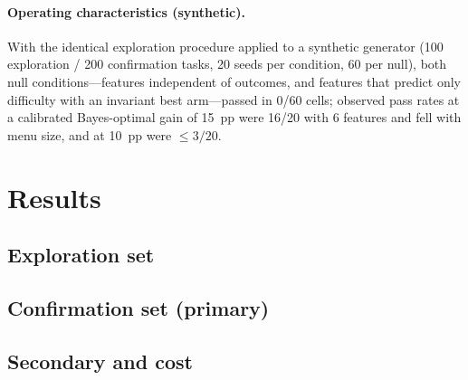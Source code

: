 \documentclass{article}
\newif\ifdraftmode
\newcommand{\draftnote}[1]{\ifdraftmode{\color{red}\textbf{[DRAFT: #1]}}\else\PackageError{main}{draftnote left in submission build: #1}{}\fi}
\begin{document}
\paragraph{Operating characteristics (synthetic).} With the identical exploration procedure applied to a synthetic generator
(100 exploration / 200 confirmation tasks, 20 seeds per condition, 60 per null), both null conditions---features independent of
outcomes, and features that predict only difficulty with an invariant best arm---passed in 0/60 cells; observed pass rates at a
calibrated Bayes-optimal gain of 15~pp were 16/20 with 6 features and fell with menu size, and at 10~pp were $\le 3/20$.
\draftnote{Table from evidence/week2/pilot\_power\_v4.md; state that these are observed pass rates under those synthetic conditions, not
power statements; gate hold rates are a property of the generator.}

\section{Results}
\label{sec:results}
\draftnote{Exploration not yet executed (approval pending). Tables are generated by paper/make\_tables.py from evidence/week2 artifacts;
nothing here is filled by hand.}
\subsection{Exploration set}
\draftnote{arm table; pool gate; frozen policy; spend from ledger.}
\subsection{Confirmation set (primary)}
\draftnote{$d$, $b$, $c$, McNemar $p$, bootstrap CI of $d$, verdict.}
\subsection{Secondary and cost}
\draftnote{post vs pre; P1; pick distribution; experiment spend vs deployment cost; measured vs conservatively attributed unknown cost.}
\end{document}

